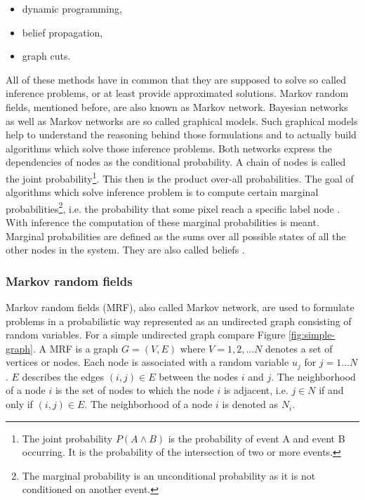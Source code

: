 \begin{itemize}
  \item dynamic programming,
  \item belief propagation,
  \item graph cuts.
\end{itemize}

\noindent All of these methods have in common that they are supposed to solve so called inference problems, or at least provide approximated solutions.
Markov random fields, mentioned before, are also known as Markov network.
Bayesian networks as well as Markov networks are so called graphical models.
Such graphical models help to understand the reasoning behind those formulations and to actually build algorithms which solve those inference problems.
Both networks express the dependencies of nodes as the conditional probability.
A chain of nodes is called the joint probability\footnote{The joint probability $P(A \land B)$ is the probability of event A and event B occurring. It is the probability of the intersection of two or more events.}.
This then is the product over-all probabilities.
The goal of algorithms which solve inference problem is to compute certain marginal probabilities\footnote{The marginal probability is an unconditional probability as it is not conditioned on another event.}, i.e. the probability that some pixel reach a specific label node \citep{cyganek2011introduction}.
With inference the computation of these marginal probabilities is meant.
Marginal probabilities are defined as the sums over all possible states of all the other nodes in the system.
They are also called beliefs \citep{yedidia2003understanding}.

\subsubsection{Markov random fields}

Markov random fields (MRF), also called Markov network, are used to formulate problems in a probabilistic way represented as an undirected graph consisting of random variables.
For a simple undirected graph compare Figure \ref{fig:simple-graph}.
\newline\newline\noindent A MRF is a graph $G = (V, E)$ where $V = {1,2,...N}$ denotes a set of vertices or nodes.
Each node is associated with a random variable $u_j$ for $j = 1...N$.
$E$ describes the edges $(i,j) \in E$ between the nodes $i$ and $j$.
The neighborhood of a node $i$ is the set of nodes to which the node $i$ is adjacent, i.e. $j \in N$ if and only if $(i,j) \in E$.
The neighborhood of a node $i$ is denoted as $N_i$.

